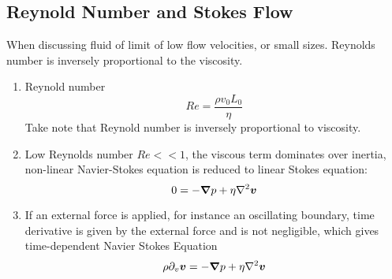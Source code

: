 \documentclass[12pt,a4paper]{article}
\begin{document}
        \subsection{Reynold Number and Stokes Flow}
            When discussing fluid of limit of low flow velocities, or small sizes. Reynolds number is inversely proportional to the viscosity.
            \begin{enumerate}
                \item Reynold number 
                $$
                    Re =\frac{\rho v_0 L_0}{\eta}
                $$
                Take note that Reynold number is inversely proportional to viscosity.
                \item Low Reynolds number $Re << 1$, the viscous term dominates over inertia, non-linear Navier-Stokes equation is reduced to linear Stokes equation:
                $$
                    0 = -\grad p +\eta\laplacian \vb*{v}
                $$
                \item If an external force is applied, for instance an oscillating boundary, time derivative is given by the external force and is not negligible, which gives time-dependent Navier Stokes Equation
                $$
                    \rho \partial_{v}\vb*{v} = -\grad p +\eta\laplacian \vb*{v}
                $$
            \end{enumerate}
\end{document}

